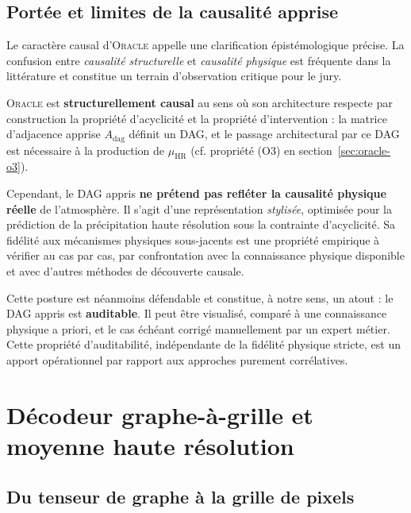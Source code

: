 \documentclass[14pt,a4paper,openany]{extreport}
\theoremstyle{definition}
\newcommand{\Oracle}{\textsc{Oracle}}
\newcommand{\HR}{\ensuremath{\text{HR}}}
\newcommand{\muHR}{\ensuremath{\mu_{\HR}}}
\newcommand{\Adag}{\ensuremath{A_{\mathrm{dag}}}}
\begin{document}
\subsection{Portée et limites de la causalité apprise}
\label{ssec:oracle-causal-limits}

Le caractère causal d'\Oracle{} appelle une clarification épistémologique précise. La confusion entre \emph{causalité structurelle} et \emph{causalité physique} est fréquente dans la littérature et constitue un terrain d'observation critique pour le jury.

\begin{disclaimerbox}
\Oracle{} est \textbf{structurellement causal} au sens où son architecture respecte par construction la propriété d'acyclicité et la propriété d'intervention : la matrice d'adjacence apprise $\Adag$ définit un DAG, et le passage architectural par ce DAG est nécessaire à la production de $\muHR$ (cf. propriété (O3) en section~\ref{sec:oracle-o3}).

Cependant, le DAG appris \textbf{ne prétend pas refléter la causalité physique réelle} de l'atmosphère. Il s'agit d'une représentation \emph{stylisée}, optimisée pour la prédiction de la précipitation haute résolution sous la contrainte d'acyclicité. Sa fidélité aux mécanismes physiques sous-jacents est une propriété empirique à vérifier au cas par cas, par confrontation avec la connaissance physique disponible et avec d'autres méthodes de découverte causale.

Cette posture est néanmoins défendable et constitue, à notre sens, un atout : le DAG appris est \textbf{auditable}. Il peut être visualisé, comparé à une connaissance physique a priori, et le cas échéant corrigé manuellement par un expert métier. Cette propriété d'auditabilité, indépendante de la fidélité physique stricte, est un apport opérationnel par rapport aux approches purement corrélatives.
\end{disclaimerbox}

\section{Décodeur graphe-à-grille et moyenne haute résolution}
\label{sec:oracle-decoder}

\subsection{Du tenseur de graphe à la grille de pixels}
\label{ssec:oracle-decoder-principe}
\end{document}
